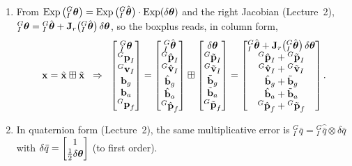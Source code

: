 \begin{enumerate}[noitemsep,topsep=2pt]
\item From $\operatorname{Exp}\big({}^{G}_{I}\boldsymbol{\mathbf{\theta}}\big) = \operatorname{Exp}\big({}^{G}_{I}\hat{\boldsymbol{\mathbf{\theta}}}\big)\cdot\operatorname{Exp}(\delta\boldsymbol{\mathbf{\theta}})$ and the right Jacobian (Lecture~2), ${}^{G}_{I}\boldsymbol{\mathbf{\theta}} = {}^{G}_{I}\hat{\boldsymbol{\mathbf{\theta}}} + \boldsymbol{\mathbf{J}}_r\big({}^{G}_{I}\hat{\boldsymbol{\mathbf{\theta}}}\big)\,\delta\boldsymbol{\mathbf{\theta}}$, so the boxplus reads, in column form,
\begin{align}
\boldsymbol{\mathbf{x}} = \hat{\boldsymbol{\mathbf{x}}} \boxplus \tilde{\boldsymbol{\mathbf{x}}}
\;\;\Rightarrow\;\;
\begin{bmatrix}
{}^{G}_{I}\boldsymbol{\mathbf{\theta}} \\ {}^{G}\boldsymbol{\mathbf{p}}_I \\ {}^{G}\boldsymbol{\mathbf{v}}_I \\ \boldsymbol{\mathbf{b}}_g \\ \boldsymbol{\mathbf{b}}_a \\ {}^{G}\boldsymbol{\mathbf{p}}_f
\end{bmatrix}
=
\begin{bmatrix}
{}^{G}_{I}\hat{\boldsymbol{\mathbf{\theta}}} \\ {}^{G}\hat{\boldsymbol{\mathbf{p}}}_I \\ {}^{G}\hat{\boldsymbol{\mathbf{v}}}_I \\ \hat{\boldsymbol{\mathbf{b}}}_g \\ \hat{\boldsymbol{\mathbf{b}}}_a \\ {}^{G}\hat{\boldsymbol{\mathbf{p}}}_f
\end{bmatrix}
\boxplus
\begin{bmatrix}
\delta\boldsymbol{\mathbf{\theta}} \\ {}^{G}\tilde{\boldsymbol{\mathbf{p}}}_I \\ {}^{G}\tilde{\boldsymbol{\mathbf{v}}}_I \\ \tilde{\boldsymbol{\mathbf{b}}}_g \\ \tilde{\boldsymbol{\mathbf{b}}}_a \\ {}^{G}\tilde{\boldsymbol{\mathbf{p}}}_f
\end{bmatrix}
=
\begin{bmatrix}
{}^{G}_{I}\hat{\boldsymbol{\mathbf{\theta}}} + \boldsymbol{\mathbf{J}}_r\big({}^{G}_{I}\hat{\boldsymbol{\mathbf{\theta}}}\big)\,\delta\boldsymbol{\mathbf{\theta}} \\
{}^{G}\hat{\boldsymbol{\mathbf{p}}}_I + {}^{G}\tilde{\boldsymbol{\mathbf{p}}}_I \\
{}^{G}\hat{\boldsymbol{\mathbf{v}}}_I + {}^{G}\tilde{\boldsymbol{\mathbf{v}}}_I \\
\hat{\boldsymbol{\mathbf{b}}}_g + \tilde{\boldsymbol{\mathbf{b}}}_g \\
\hat{\boldsymbol{\mathbf{b}}}_a + \tilde{\boldsymbol{\mathbf{b}}}_a \\
{}^{G}\hat{\boldsymbol{\mathbf{p}}}_f + {}^{G}\tilde{\boldsymbol{\mathbf{p}}}_f
\end{bmatrix}.
\end{align}
\item In quaternion form (Lecture~2), the same multiplicative error is
${}^{G}_{I}\bar{q} = {}^{G}_{I}\hat{\bar{q}} \otimes \delta\bar{q}$ with
$\delta\bar{q} = \begin{bmatrix} 1 \\ \frac{1}{2}\delta\boldsymbol{\mathbf{\theta}} \end{bmatrix}$ (to first order).
\end{enumerate}

